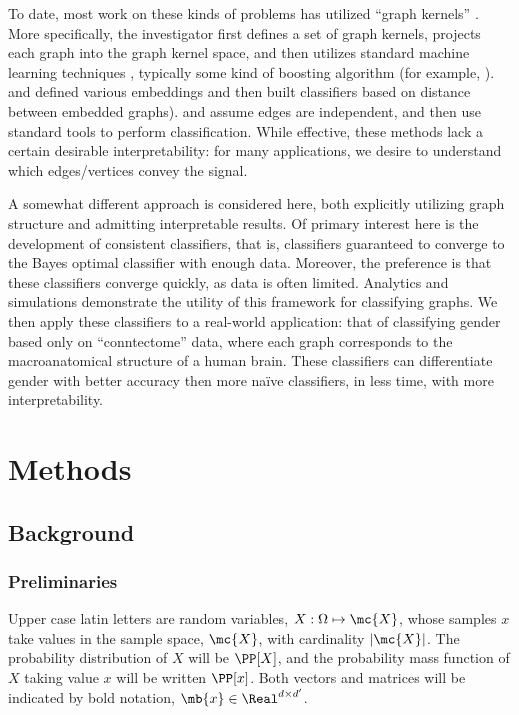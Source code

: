 To date, most work on these kinds of problems has utilized ``graph kernels'' \cite{Gartner03}.  More specifically, the investigator first defines a set of graph kernels, projects each graph into the graph kernel space, and then utilizes standard machine learning techniques \cite{HastieFriedman01}, typically some kind of boosting algorithm \cite{FreundSchapire95} (for example, \cite{KashimaInokuchi02, KashimaInokuchi03, KudoMatsumoto04}). \cite{BunkeRiesen08} and \cite{RiesenBunke09} defined various embeddings and then built classifiers based on distance between embedded graphs). \cite{FlachLachiche04} and \cite{TrentinIorio09} assume edges are independent, and then use standard tools to perform classification.  While effective, these methods lack a certain desirable interpretability: for many applications, we desire to understand which edges/vertices convey the signal.  

A somewhat different approach is considered here, both explicitly utilizing graph structure and admitting interpretable results.  Of primary interest here is the development of consistent classifiers, that is, classifiers guaranteed to converge to the Bayes optimal classifier with enough data.  Moreover, the preference is that these classifiers converge quickly, as data is often limited.  Analytics and simulations demonstrate the utility of this framework for classifying graphs.  We then apply these classifiers to a real-world application: that of classifying gender based only on ``conntectome'' data,  where each graph corresponds to the macroanatomical structure of a human brain.  These classifiers can differentiate gender with better accuracy then more na\"ive classifiers, in less time, with more interpretability.


\section{Methods} %
\label{sec:methods}

\subsection{Background} %

\subsubsection{Preliminaries}
\label{sec:prelim}
Upper case latin letters are random variables, $X: \Omega \mapsto \mc{X}$, whose samples $x$ take values in  the sample space, $\mc{X}$, with cardinality $|\mc{X}|$.  The probability distribution of $X$ will be $\PP[X]$, and the probability mass function of $X$ taking value $x$ will be written $\PP[x]$. Both vectors and matrices will be indicated by bold notation, $\mb{x} \in \Real^{d \times d'}$.

